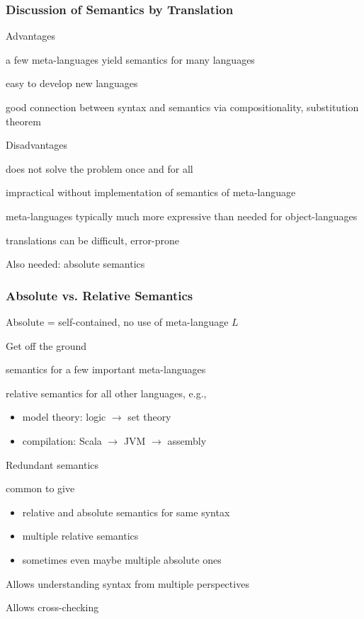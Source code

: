 \begin{frame}\frametitle{Discussion of Semantics by Translation}
\begin{blockitems}{Advantages}
\item a few meta-languages yield semantics for many languages
\item easy to develop new languages
\item good connection between syntax and semantics via compositionality, substitution theorem
\end{blockitems}

\begin{blockitems}{Disadvantages}
\item does not solve the problem once and for all
\item impractical without implementation of semantics of meta-language
\item meta-languages typically much more expressive than needed for object-languages
\item translations can be difficult, error-prone
\end{blockitems}

Also needed: absolute semantics
\end{frame}

\begin{frame}\frametitle{Absolute vs. Relative Semantics}
Absolute = self-contained, no use of meta-language $L$

\begin{blockitems}{Get off the ground}
 \item semantics for a few important meta-languages
 \item relative semantics for all other languages, e.g.,
  \begin{itemize}
  \item model theory: logic $\to$ set theory
  \item compilation: Scala $\to$ JVM $\to$ assembly
  \end{itemize}
\end{blockitems}

\begin{blockitems}{Redundant semantics}
 \item common to give
 \begin{itemize}
  \item relative and absolute semantics for same syntax
  \item multiple relative semantics
  \item sometimes even maybe multiple absolute ones
 \end{itemize}
 \item Allows understanding syntax from multiple perspectives
 \item Allows cross-checking 
\end{blockitems}
\end{frame}


